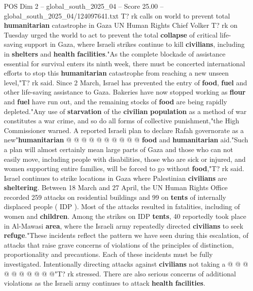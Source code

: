 \begin{textsample}{POS Dim 2 – global\_south\_2025\_04 – Score 25.00 – global\_south\_2025\_04/124097641.txt}  \label{ex:f2_pos_275}
T? rk calls on world to prevent total \textbf{humanitarian} catastrophe in Gaza UN Human Rights Chief Volker T? rk on Tuesday urged the world to act to prevent the total \textbf{collapse} of critical life-saving support in Gaza, where Israeli strikes continue to kill \textbf{civilians}, including in \textbf{shelters} and \textbf{health} \textbf{facilities}."As the complete blockade of assistance essential for survival enters its ninth week, there must be concerted international efforts to stop this \textbf{humanitarian} catastrophe from reaching a new unseen level,"T? rk said.
Since 2 March, Israel has prevented the entry of \textbf{food}, \textbf{fuel} and other life-saving assistance to Gaza.
Bakeries have now stopped working as \textbf{flour} and \textbf{fuel} have run out, and the remaining stocks of \textbf{food} are being rapidly depleted."Any use of \textbf{starvation} of the \textbf{civilian} \textbf{population} as a method of war constitutes a war crime, and so do all forms of collective punishment,"the High Commissioner warned.
A reported Israeli plan to declare Rafah governorate as a new"\textbf{humanitarian} @ @ @ @ @ @ @ @ @ @ \textbf{food} and \textbf{humanitarian} aid."Such a plan will almost certainly mean large parts of Gaza and those who can not easily move, including people with disabilities, those who are sick or injured, and women supporting entire families, will be forced to go without \textbf{food},"T? rk said.
Israel continues to strike locations in Gaza where Palestinian \textbf{civilians} are \textbf{sheltering}.
Between 18 March and 27 April, the UN Human Rights Office recorded 259 attacks on residential buildings and 99 on \textbf{tents} of internally displaced people ( IDP ).
Most of the attacks resulted in fatalities, including of women and \textbf{children}.
Among the strikes on IDP \textbf{tents}, 40 reportedly took place in Al-Mawasi \textbf{area}, where the Israeli army repeatedly directed \textbf{civilians} to seek \textbf{refuge}."These incidents reflect the pattern we have seen during this escalation, of attacks that raise grave concerns of violations of the principles of distinction, proportionality and precautions.
Each of these incidents must be fully investigated.
Intentionally directing attacks against \textbf{civilians} not taking a @ @ @ @ @ @ @ @ @ @"T? rk stressed.
There are also serious concerns of additional violations as the Israeli army continues to attack \textbf{health} \textbf{facilities}.

\end{textsample}
